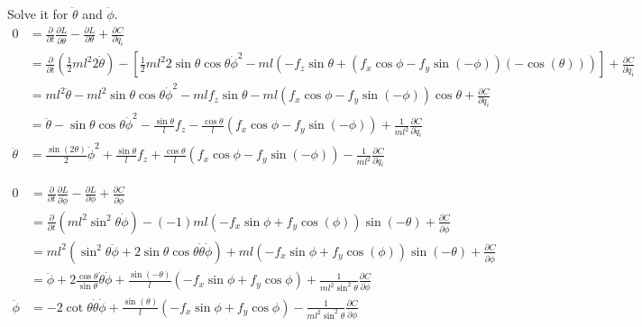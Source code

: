 \documentclass{scrartcl}
\begin{document}
Solve it for $\ddot{\theta}$ and $\ddot{\phi}$.
\begin{equation}
\begin{split}
0& = \frac{\partial }{\partial t} \frac{\partial L}{\partial \dot{\theta}} - \frac{\partial L}{\partial \theta} + \frac{\partial C}{\partial \dot{q}_i}	\\
& = \frac{\partial }{\partial t} ( \frac{1}{2} m  l^2 2 \dot{\theta}) 
 - [
      \frac{1}{2} m  l^2 2 \sin\theta \cos\theta \dot{\phi}^2 
      - ml ( -f_z \sin\theta + (f_x\cos\phi-f_y\sin(-\phi))(-\cos(\theta))  )
    ]
    + \frac{\partial C}{\partial \dot{q}_i}					\\
%
& =  m  l^2 \ddot{\theta} 
 - m  l^2 \sin\theta \cos\theta \dot{\phi}^2 - m l f_z \sin\theta - ml(f_x\cos\phi - f_y\sin(-\phi))\cos\theta
 + \frac{\partial C}{\partial \dot{q}_i}											\\
%
& =  \ddot{\theta} 
- \sin\theta \cos\theta \dot{\phi}^2 - \frac{\sin\theta}{l} f_z - \frac{\cos\theta}{l}(f_x\cos\phi - f_y\sin(-\phi))
+ \frac{1}{ml^2}\frac{\partial C}{\partial \dot{q}_i}        \\
%
\ddot{\theta}& = \frac{\sin(2\theta)}{2} \dot{\phi}^2 
+ \frac{\sin\theta}{l} f_z + \frac{\cos\theta}{l}(f_x\cos\phi - f_y\sin(-\phi))
- \frac{1}{ml^2}\frac{\partial C}{\partial \dot{q}_i}
\end{split}
\end{equation}

\begin{equation}
\begin{split}
0& = \frac{\partial }{\partial t} \frac{\partial L}{\partial \dot{\phi}} - \frac{\partial L}{\partial \phi} + \frac{\partial C}{\partial \dot{\phi}}	\\
& = \frac{\partial }{\partial t} ( m  l^2 \sin^2\theta \dot{\phi}) 
- (-1) m l (-f_x \sin\phi + f_y \cos(\phi)) \sin(-\theta)
+ \frac{\partial C}{\partial \dot{\phi}}								\\
%
& = m  l^2(\sin^2\theta \ddot{\phi} + 2 \sin\theta \cos\theta \dot{\theta} \dot{\phi})
+ml (-f_x\sin\phi + f_y \cos(\phi)) \sin(-\theta)
+ \frac{\partial C}{\partial \dot{\phi}}	\\
%
& = \ddot{\phi} + 2\frac{\cos\theta}{\sin\theta} \dot{\theta} \dot{\phi}
+ \frac{\sin(-\theta)}{l}(-f_x\sin\phi + f_y \cos\phi)
+ \frac{1}{ml^2\sin^2\theta}\frac{\partial C}{\partial \dot{\phi}}		\\
\ddot{\phi}& = - 2\cot{\theta} \dot{\theta} \dot{\phi} 
+ \frac{\sin(\theta)}{l}(-f_x\sin\phi + f_y \cos\phi)
- \frac{1}{ml^2\sin^2\theta}\frac{\partial C}{\partial \dot{\phi}}
\end{split}
\end{equation}
\end{document}
